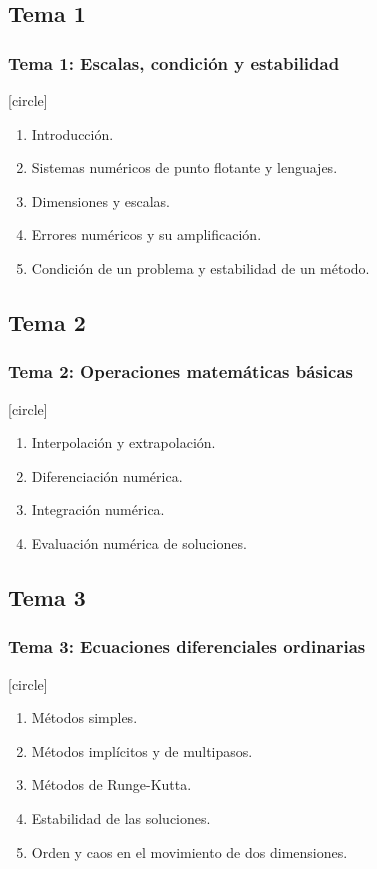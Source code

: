 \documentclass[12pt]{beamer}
\begin{document}
\subsection*{Tema 1}
\begin{frame}
\frametitle{\textbf{Tema 1: Escalas, condición y estabilidad}}
[circle]
\begin{enumerate}[<+->]
\item Introducción.
\item Sistemas numéricos de punto flotante y lenguajes.
\item Dimensiones y escalas.
\item Errores numéricos y su amplificación.
\item Condición de un problema y estabilidad de un método.
\end{enumerate}
\end{frame}
\subsection*{Tema 2}
\begin{frame}
\frametitle{\textbf{Tema 2: Operaciones matemáticas básicas}}
[circle]
\begin{enumerate}[<+->]
\item Interpolación y extrapolación.
\item Diferenciación numérica.
\item Integración numérica.
\item Evaluación numérica de soluciones.
\end{enumerate}
\end{frame}
\subsection*{Tema 3}
\begin{frame}
\frametitle{\textbf{Tema 3: Ecuaciones diferenciales ordinarias}}
[circle]
\begin{enumerate}[<+->]
\item Métodos simples.
\item Métodos implícitos y de multipasos.
\item Métodos de Runge-Kutta.
\item Estabilidad de las soluciones.
\item Orden y caos en el movimiento de dos dimensiones.
\end{enumerate}
\end{frame}
\end{document}
